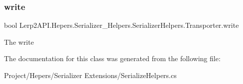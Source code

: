 \subsubsection{\texorpdfstring{write}{write}}
{\footnotesize\ttfamily bool Lerp2\+A\+P\+I.\+Hepers.\+Serializer\+\_\+\+Helpers.\+Serializer\+Helpers.\+Transporter.\+write}



The write 



The documentation for this class was generated from the following file\+:\begin{DoxyCompactItemize}
\item 
Project/\+Hepers/\+Serializer Extensions/Serialize\+Helpers.\+cs\end{DoxyCompactItemize}
